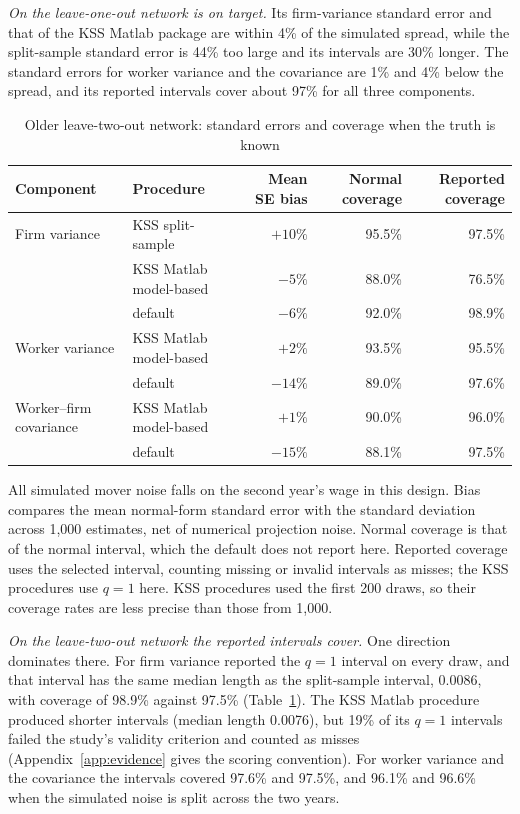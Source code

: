 \emph{On the leave-one-out network \fevc{} is on target.} Its firm-variance standard
error and that of the KSS Matlab package are within 4\% of the simulated spread, while
the split-sample standard error is 44\% too large and its intervals are 30\% longer.
The \fevc{} standard errors for worker variance and the covariance are 1\% and 4\%
below the spread, and its reported intervals cover about 97\% for all three
components.

\begin{table}[htbp]\centering
\caption{Older leave-two-out network: standard errors and coverage when the truth is known}
\label{tab:known}
\small\setlength{\tabcolsep}{4pt}\begin{tabular}{@{}llrrr@{}}
\toprule
Component & Procedure & Mean SE bias & Normal coverage & Reported coverage\\
\midrule
Firm variance & KSS split-sample & $+10\%$ & 95.5\% & 97.5\%\\
              & KSS Matlab model-based & $-5\%$ & 88.0\% & 76.5\%\\
              & \fevc{} default & $-6\%$ & 92.0\% & 98.9\%\\
\addlinespace
Worker variance & KSS Matlab model-based & $+2\%$ & 93.5\% & 95.5\%\\
                & \fevc{} default & $-14\%$ & 89.0\% & 97.6\%\\
Worker--firm covariance & KSS Matlab model-based & $+1\%$ & 90.0\% & 96.0\%\\
                        & \fevc{} default & $-15\%$ & 88.1\% & 97.5\%\\
\bottomrule
\end{tabular}
\par\smallskip\begin{minipage}{0.92\linewidth}\footnotesize
All simulated mover noise falls on the second year's wage in this design.
Bias compares the mean normal-form standard error with the standard
deviation across 1,000 \fevc{} estimates, net of numerical projection noise.
Normal coverage is that of the normal interval, which the \fevc{} default does not
report here. Reported coverage uses the selected interval, counting missing or invalid
intervals as misses; the KSS procedures use $q=1$ here. KSS procedures used the first 200
draws, so their coverage rates are less precise than those from 1,000.
\end{minipage}
\end{table}

\emph{On the leave-two-out network the reported intervals cover.} One direction
dominates there. For firm variance \fevc{} reported the $q=1$ interval on every draw,
and that interval has the same median length as the split-sample interval,
0.0086, with coverage of 98.9\% against 97.5\% (Table~\ref{tab:known}). The KSS Matlab
procedure produced shorter intervals (median length 0.0076), but 19\% of its $q=1$
intervals failed the study's validity criterion and counted as misses
(Appendix~\ref{app:evidence} gives the scoring convention). For worker variance and
the covariance the \fevc{} intervals covered 97.6\% and 97.5\%, and 96.1\% and 96.6\%
when the simulated noise is split across the two years.

